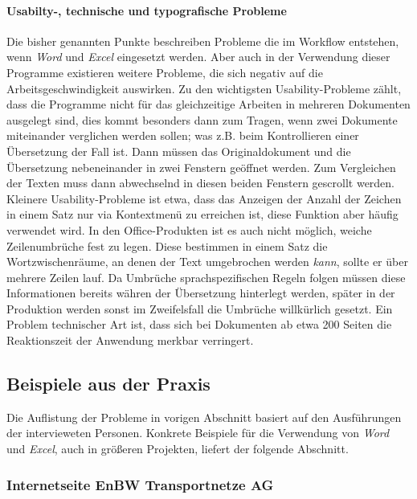 \paragraph{Usabilty-, technische und typografische Probleme} Die bisher genannten Punkte beschreiben Probleme die im Workflow entstehen, wenn \emph{Word} und \emph{Excel} eingesetzt werden. Aber auch in der Verwendung dieser Programme existieren weitere Probleme, die sich negativ auf die Arbeitsgeschwindigkeit auswirken. Zu den wichtigsten Usability-Probleme zählt, dass die Programme nicht für das gleichzeitige Arbeiten in mehreren Dokumenten ausgelegt sind, dies kommt besonders dann zum Tragen, wenn zwei Dokumente miteinander verglichen werden sollen; was z.B. beim Kontrollieren einer Übersetzung der Fall ist. Dann müssen das Originaldokument und die Übersetzung nebeneinander in zwei Fenstern geöffnet werden. Zum Vergleichen der Texten muss dann abwechselnd in diesen beiden Fenstern gescrollt werden. Kleinere Usability-Probleme ist etwa, dass das Anzeigen der Anzahl der Zeichen in einem Satz nur via Kontextmenü zu erreichen ist, diese Funktion aber häufig verwendet wird. In den Office-Produkten ist es auch nicht möglich, weiche Zeilenumbrüche fest zu legen. Diese bestimmen in einem Satz die Wortzwischenräume, an denen der Text umgebrochen werden \emph{kann}, sollte er über mehrere Zeilen lauf. Da Umbrüche sprachspezifischen Regeln folgen müssen diese Informationen bereits währen der Übersetzung hinterlegt werden, später in der Produktion werden sonst im Zweifelsfall die Umbrüche willkürlich gesetzt. Ein Problem technischer Art ist, dass sich bei Dokumenten ab etwa 200 Seiten die Reaktionszeit der Anwendung merkbar verringert.

\subsection{Beispiele aus der Praxis}\label{l:praxisbeispiele}

Die Auflistung der Probleme in vorigen Abschnitt basiert auf den Ausführungen der intervieweten Personen. Konkrete Beispiele für die Verwendung von \emph{Word} und \emph{Excel}, auch in größeren Projekten, liefert der folgende Abschnitt.

\subsubsection{Internetseite EnBW Transportnetze AG}

